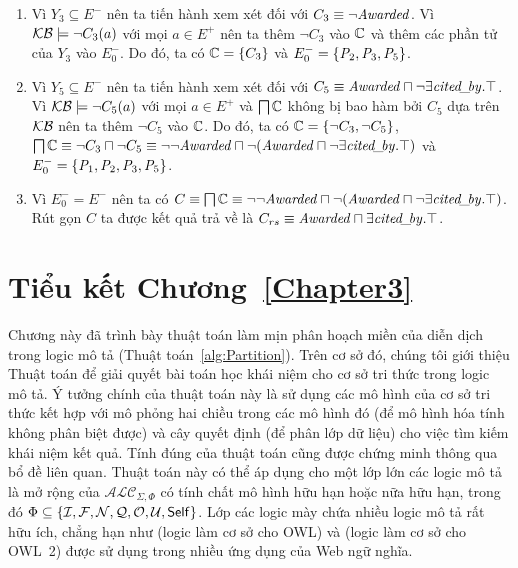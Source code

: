 \begin{Example}
\begin{enumerate}
		\item Vì $Y_3 \subseteq E^-$ nên ta tiến hành xem xét đối với $C_3 \equiv \neg\mathit{Awarded}$. Vì $\mathcal{KB} \models \neg C_3(a)$ với mọi $a \in E^+$ nên ta thêm $\neg C_3$ vào $\mathbb{C}$ và thêm các phần tử của $Y_3$ vào $E^-_0$. Do đó, ta có $\mathbb{C} = \{C_3\}$ và $E^-_0 = \{\mathit{P}_2,\mathit{P}_3,\mathit{P}_5\}$.
		
		\item Vì $Y_5 \subseteq E^-$ nên ta tiến hành xem xét đối với $C_5 \equiv \mathit{Awarded} \sqcap \neg\exists\mathit{cited\!\_\!by}.\top$. Vì $\mathcal{KB} \models \neg C_5(a)$ với mọi $a \in E^+$ và $\bigsqcap\mathbb{C}$ không bị bao hàm bởi $C_5$ dựa trên $\mathcal{KB}$ nên ta thêm $\neg C_5$ vào $\mathbb{C}$. Do đó, ta có $\mathbb{C} = \{\neg C_3, \neg C_5\}$, $\bigsqcap\mathbb{C} \equiv \neg C_3 \sqcap \neg C_5 \equiv \neg\neg\mathit{Awarded} \sqcap \neg (\mathit{Awarded} \sqcap \neg\exists\mathit{cited\!\_\!by}.\top)$ và $E^-_0 = \{\mathit{P}_1,\mathit{P}_2,\mathit{P}_3,\mathit{P}_5\}$.
		
		\item Vì $E^-_0 = E^-$ nên ta có $C \equiv \bigsqcap\mathbb{C} \equiv \neg\neg\mathit{Awarded} \sqcap \neg(\mathit{Awarded} \sqcap \neg \exists\mathit{cited\!\_\!by}.\top)$. Rút gọn $C$ ta được kết quả trả về là $C_{rs} \equiv \mathit{Awarded} \sqcap \exists\mathit{cited\!\_\!by}.\top$.\myend  
	\end{enumerate}
\end{Example}

\section*{Tiểu kết Chương~\ref{Chapter3}}
\label{sec:Chap3.Summary}
Chương này đã trình bày thuật toán làm mịn phân hoạch miền của diễn dịch trong logic mô tả (Thuật toán~\ref{alg:Partition}). Trên cơ sở đó, chúng tôi giới thiệu Thuật toán \BBCLearnS để giải quyết bài toán học khái niệm cho cơ sở tri thức trong logic mô tả. 
Ý tưởng chính của thuật toán này là sử dụng các mô hình của cơ sở tri thức kết hợp với mô phỏng hai chiều trong các mô hình đó (để mô hình hóa tính không phân biệt được) và cây quyết định (để phân lớp dữ liệu) cho việc tìm kiếm khái niệm kết quả. Tính đúng của thuật toán \BBCLearnS cũng được chứng minh thông qua bổ đề liên quan.
Thuật toán này có thể áp dụng cho một lớp lớn các logic mô tả là mở rộng của $\mathcal{ALC}_{\Sigma,\Phi}$ có tính chất mô hình hữu hạn hoặc nữa hữu hạn, trong đó $\Phi \subseteq \{\mathcal{I}, \mathcal{F}, \mathcal{N}, \mathcal{Q}, \mathcal{O}, \mathcal{U}, \mathsf{Self}\}$. Lớp các logic mày chứa nhiều logic mô tả rất hữu ích, chẳng hạn như \SHIQ (logic làm cơ sở cho OWL) và \SROIQ (logic làm cơ sở cho OWL~2) được sử dụng trong nhiều ứng dụng của Web ngữ nghĩa.
